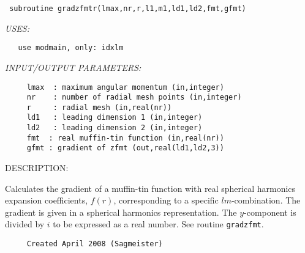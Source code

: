 \documentclass[11pt]{article}
\begin{document}
\begin{verbatim} subroutine gradzfmtr(lmax,nr,r,l1,m1,ld1,ld2,fmt,gfmt)\end{verbatim}{\em USES:}
\begin{verbatim}   use modmain, only: idxlm\end{verbatim}{\em INPUT/OUTPUT PARAMETERS:}
\begin{verbatim}     lmax  : maximum angular momentum (in,integer)
     nr    : number of radial mesh points (in,integer)
     r     : radial mesh (in,real(nr))
     ld1   : leading dimension 1 (in,integer)
     ld2   : leading dimension 2 (in,integer)
     fmt  : real muffin-tin function (in,real(nr))
     gfmt : gradient of zfmt (out,real(ld1,ld2,3))\end{verbatim}
{\sf DESCRIPTION:\\ }


     Calculates the gradient of a muffin-tin function with real spherical 
     harmonics expansion coefficients, $f(r)$, corresponding to a specific
     $lm$-combination. The gradient is given in a spherical harmonics
     representation.
     The $y$-component is divided by $i$ to be expressed as a real number.
     See routine {\tt gradzfmt}.
  
\begin{verbatim}     Created April 2008 (Sagmeister)\end{verbatim}

















\end{document}
